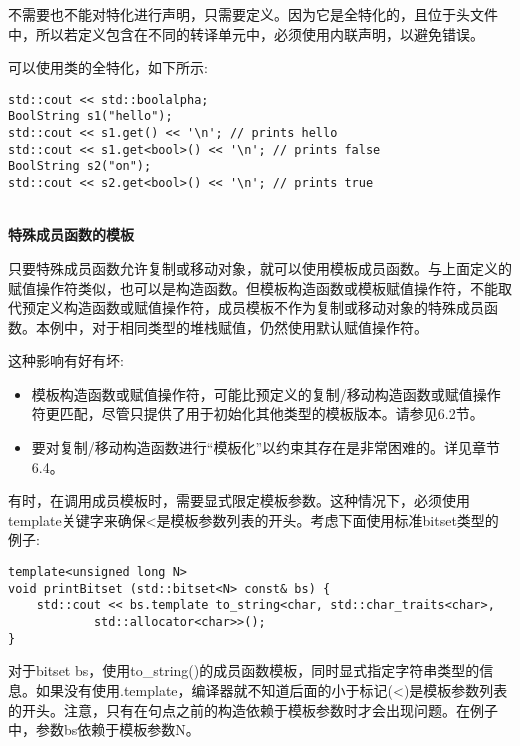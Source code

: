 不需要也不能对特化进行声明，只需要定义。因为它是全特化的，且位于头文件中，所以若定义包含在不同的转译单元中，必须使用内联声明，以避免错误。

可以使用类的全特化，如下所示:

\begin{lstlisting}[style=styleCXX]
std::cout << std::boolalpha;
BoolString s1("hello");
std::cout << s1.get() << '\n'; // prints hello
std::cout << s1.get<bool>() << '\n'; // prints false
BoolString s2("on");
std::cout << s2.get<bool>() << '\n'; // prints true
\end{lstlisting}

\hspace*{\fill} \\ %
\noindent
\textbf{特殊成员函数的模板}

只要特殊成员函数允许复制或移动对象，就可以使用模板成员函数。与上面定义的赋值操作符类似，也可以是构造函数。但模板构造函数或模板赋值操作符，不能取代预定义构造函数或赋值操作符，成员模板不作为复制或移动对象的特殊成员函数。本例中，对于相同类型的堆栈赋值，仍然使用默认赋值操作符。

这种影响有好有坏:

\begin{itemize}
\item 
模板构造函数或赋值操作符，可能比预定义的复制/移动构造函数或赋值操作符更匹配，尽管只提供了用于初始化其他类型的模板版本。请参见6.2节。

\item 
要对复制/移动构造函数进行“模板化”以约束其存在是非常困难的。详见章节6.4。
\end{itemize}


有时，在调用成员模板时，需要显式限定模板参数。这种情况下，必须使用template关键字来确保<是模板参数列表的开头。考虑下面使用标准bitset类型的例子:

\begin{lstlisting}[style=styleCXX]
template<unsigned long N>
void printBitset (std::bitset<N> const& bs) {
	std::cout << bs.template to_string<char, std::char_traits<char>,
			std::allocator<char>>();
}
\end{lstlisting}

对于bitset bs，使用to\_string()的成员函数模板，同时显式指定字符串类型的信息。如果没有使用.template，编译器就不知道后面的小于标记(<)是模板参数列表的开头。注意，只有在句点之前的构造依赖于模板参数时才会出现问题。在例子中，参数bs依赖于模板参数N。

